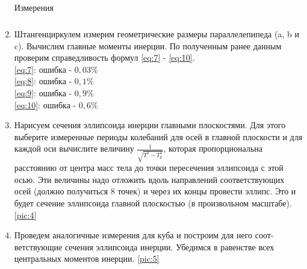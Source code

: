 \documentclass[a4paper,12pt]{article} %
\begin{document}
\begin{enumerate}
\begin{table} [h]
\begin{tabular}{l|l|lllll}
\label{tab:1}

\end{tabular}
\caption[Таблица 1]{Измерения}
\end{table}

\item Штангенциркулем измерим геометрические размеры параллелепипе­да (a, b и c). Вычислим главные моменты инерции. По полученным ранее дан­ным проверим справедливость формул \eqref{eq:7} - \eqref{eq:10}. \\
\eqref{eq:7}: ошибка - $0,03\%$ \\
\eqref{eq:8}: ошибка - $0,1\%$ \\
\eqref{eq:9}: ошибка - $0,9\%$ \\
\eqref{eq:10}: ошибка - $0,6\%$ \\

\item  Нарисуем  сечения  эллипсоида  инерции  главными  плоскостями.  Для этого  выберите  измеренные  периоды колебаний  для  осей  в  главной плоскости и для каждой оси вычислите величину $\frac{1}{\sqrt{T^2 - T_p^2}}$, которая пропорциональна расстоянию  от  центра масс  тела до точки  пересече­ния эллипсоида с этой осью.  Эти величины надо отложить вдоль направлений соот­ветствующих осей (должно получиться 8 точек) и через их концы про­вести  эллипс.  Это и будет  сечение  эллипсоида главной  плоскостью  (в произвольном масштабе). \ref{pic:4}

\item Проведем аналогичные измерения для куба и построим для него соот­ветствующие сечения эллипсоида инерции. Убедимся в равенстве всех центральных моментов инерции. \ref{pic:5}

\newpage


\end{enumerate}
\end{document}
